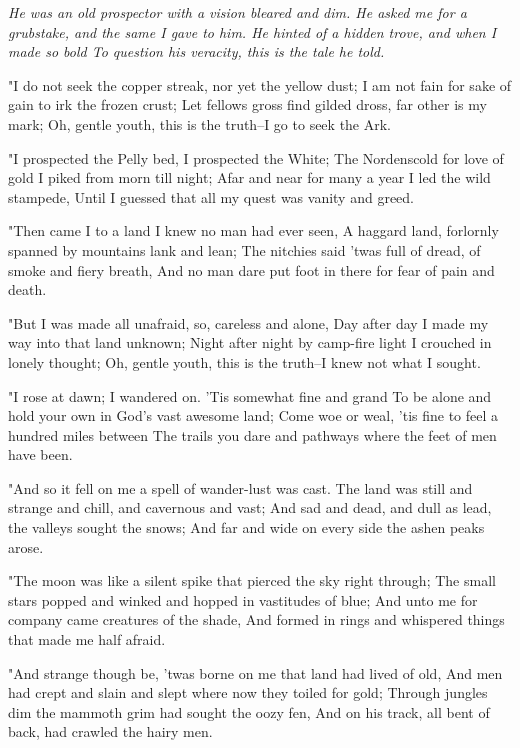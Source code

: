 
\begin{poemblock}
\textit{
  He was an old prospector with a vision bleared and dim.
  He asked me for a grubstake, and the same I gave to him.
  He hinted of a hidden trove, and when I made so bold
  To question his veracity, this is the tale he told.
}

 "I do not seek the copper streak, nor yet the yellow dust;
 I am not fain for sake of gain to irk the frozen crust;
 Let fellows gross find gilded dross, far other is my mark;
 Oh, gentle youth, this is the truth--I go to seek the Ark.

 "I prospected the Pelly bed, I prospected the White;
 The Nordenscold for love of gold I piked from morn till night;
 Afar and near for many a year I led the wild stampede,
 Until I guessed that all my quest was vanity and greed.

 "Then came I to a land I knew no man had ever seen,
 A haggard land, forlornly spanned by mountains lank and lean;
 The nitchies said 'twas full of dread, of smoke and fiery breath,
 And no man dare put foot in there for fear of pain and death.

 "But I was made all unafraid, so, careless and alone,
 Day after day I made my way into that land unknown;
 Night after night by camp-fire light I crouched in lonely thought;
 Oh, gentle youth, this is the truth--I knew not what I sought.

 "I rose at dawn; I wandered on.  'Tis somewhat fine and grand
 To be alone and hold your own in God's vast awesome land;
 Come woe or weal, 'tis fine to feel a hundred miles between
 The trails you dare and pathways where the feet of men have been.

 "And so it fell on me a spell of wander-lust was cast.
 The land was still and strange and chill, and cavernous and vast;
 And sad and dead, and dull as lead, the valleys sought the snows;
 And far and wide on every side the ashen peaks arose.

 "The moon was like a silent spike that pierced the sky right through;
 The small stars popped and winked and hopped in vastitudes of blue;
 And unto me for company came creatures of the shade,
 And formed in rings and whispered things that made me half afraid.

 "And strange though be, 'twas borne on me that land had lived of old,
 And men had crept and slain and slept where now they toiled for gold;
 Through jungles dim the mammoth grim had sought the oozy fen,
 And on his track, all bent of back, had crawled the hairy men.


\end{poemblock}
